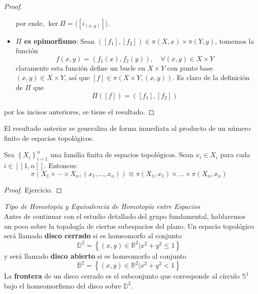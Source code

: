 \documentclass{article}
\newcounter{it}
\theoremstyle{largebreak}
\newcommand\subtitle[1]{\textit{\large #1}\\}
\newcommand\natint[1]{\ensuremath{\left[\!\left[ #1\right]\!\right]}}
\begin{document}
\begin{proof}
\begin{itemize}
            por ende, $\ker\Pi=\langle[i_{(x,y)}]\rangle$.
            \item \textbf{$\Pi$ es epimorfismo}: Sean $([f_1],[f_2])\in\pi(X,x)\times\pi(Y,y)$, tomemos la función
            \begin{equation*}
                f(x,y)=(f_1(x),f_2(y)),\quad\forall (x,y)\in X\times Y
            \end{equation*}
            claramente esta función define un bucle en $X\times Y$ con punto base $(x,y)\in X\times Y$, así que $[f]\in\pi(X\times Y,(x,y))$. Es claro de la definición de $\Pi$ que
            \begin{equation*}
                \Pi([f])=([f_1],[f_2])
            \end{equation*}
        \end{itemize}
        por los incisos anteriores, se tiene el resultado.
    \end{proof}

    \begin{obs}
        El resultado anterior se generaliza de forma inmediata al producto de un número finito de espacios topológicos.
    \end{obs}

    \begin{theor}
        Sea $\left\{X_i \right\}_{ i=1}^n$ una familia finita de espacios topológicos. Sean $x_i\in X_i$ para cada $i\in\natint{1,n}$. Entonces:
        \begin{equation*}
            \pi(X_1\times\cdots\times X_n,(x_1,...,x_n))\cong\pi(X_1,x_1)\times\dots\times\pi(X_n,x_n)
        \end{equation*}
    \end{theor}

    \begin{proof}
        Ejercicio.
    \end{proof}

    \subtitle{Tipo de Homotopía y Equivalencia de Homotopía entre Espacios}

    Antes de continuar con el estudio detallado del grupo fundamental, hablaremos un poco sobre la topología de ciertos subespacios del plano. Un espacio topológico será llamado \textbf{disco cerrado} si es homeomorfo al conjunto 
    \begin{equation*}
        \mathbb{D}^2=\left\{(x,y)\in\mathbb{R}^2\Big|x^2+y^2\leq1 \right\}
    \end{equation*}
    y será llamado \textbf{disco abierto} si es homeomorfo al conjunto
    \begin{equation*}
        \mathbb{B}^2=\left\{(x,y)\in\mathbb{R}^2\Big|x^2+y^2<1 \right\}
    \end{equation*}
    La \textbf{frontera} de un disco cerrado es el subconjunto que corresponde al círculo $\mathbb{S}^1$ bajo el homeomorfismo del disco sobre $\mathbb{D}^2$.
\end{document}
